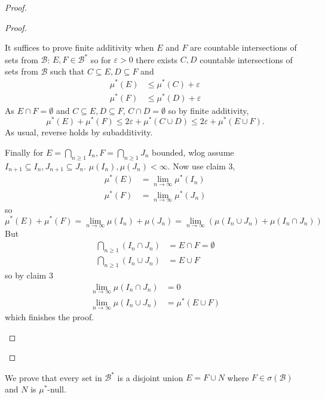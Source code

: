 \documentclass[a4paper]{article}
\begin{document}
\begin{proof}
\begin{proof}
\begin{enumerate}
      It suffices to prove finite additivity when \(E\) and \(F\) are countable intersections of sets from \(\mathcal B\): \(E,F \in \mathcal B^*\) so for \(\varepsilon > 0\) there exists \(C, D\) countable intersections of sets from \(\mathcal B\) such that \(C \subseteq E, D \subseteq F\) and
      \begin{align*}
        \mu^*(E) &\leq \mu^*(C) + \varepsilon \\
        \mu^*(F) &\leq \mu^*(D) + \varepsilon
      \end{align*}
      As \(E \cap F = \emptyset\) and \(C \subseteq E, D \subseteq F\), \(C \cap D = \emptyset\) so by finite additivity,
      \[
        \mu^*(E) +\mu^*(F) \leq 2\varepsilon + \mu^*(C \cup D) \leq 2 \varepsilon + \mu^*(E \cup F).
      \]
      As usual, reverse holds by subadditivity.

      Finally for \(E = \bigcap_{n \geq 1} I_n, F = \bigcap_{n \geq 1} J_n\) bounded, wlog assume \(I_{n + 1} \subseteq I_n, J_{n + 1} \subseteq J_n\). \(\mu(I_n), \mu(J_n) < \infty\). Now use claim 3,
      \begin{align*}
        \mu^*(E) &= \lim_{n \to \infty} \mu^*(I_n) \\
        \mu^*(F) &= \lim_{n \to \infty} \mu^*(J_n)
      \end{align*}
      so
      \[
        \mu^*(E) + \mu^*(F)
        = \lim_{n \to \infty} \mu(I_n) + \mu(J_n)
        = \lim_{n \to \infty} (\mu(I_n \cup J_n) + \mu(I_n \cap J_n))
      \]
      But
      \begin{align*}
        \bigcap_{n \geq 1} (I_n \cap J_n) &= E \cap F = \emptyset \\
        \bigcap_{n \geq 1} (I_n \cup J_n) &= E \cup F
      \end{align*}
      so by claim 3
      \begin{align*}
        \lim_{n \to \infty} \mu(I_n \cap J_n) &= 0 \\
        \lim_{n \to \infty} \mu(I_n \cup J_n) &= \mu^*(E \cup F)
      \end{align*}
      which finishes the proof.
    \end{enumerate}
  \end{proof}
\end{proof}

\begin{remark}
  We prove that every set in \(\mathcal B^*\) is a disjoint union \(E = F \cup N\) where \(F \in \sigma(\mathcal B)\) and \(N\) is \(\mu^*\)-null.
\end{remark}
\end{document}
